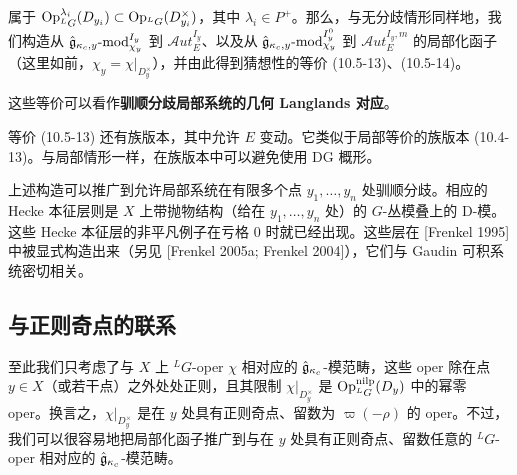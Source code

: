 属于 $\operatorname{Op}^{\lambda_i}_{{}^L G}(D_{y_i})\subset\operatorname{Op}_{{}^L G}(D^\times_{y_i})$，其中 $\lambda_i\in P^+$。那么，与无分歧情形同样地，我们构造从 $\hat{\mathfrak{g}}_{\kappa_c,y}\text{-mod}^{I_y}_{\chi_y}$ 到 $\mathcal{A}ut^{I_y}_E$、以及从 $\hat{\mathfrak{g}}_{\kappa_c,y}\text{-mod}^{I^0_y}_{\chi_y}$ 到 $\mathcal{A}ut^{I_y,m}_E$ 的局部化函子（这里如前，$\chi_y=\chi|_{D^\times_y}$），并由此得到猜想性的等价 (10.5-13)、(10.5-14)。

这些等价可以看作\textbf{驯顺分歧局部系统的几何 Langlands 对应}。

等价 (10.5-13) 还有族版本，其中允许 $E$ 变动。它类似于局部等价的族版本 (10.4-13)。与局部情形一样，在族版本中可以避免使用 DG 概形。

上述构造可以推广到允许局部系统在有限多个点 $y_1,\dots,y_n$ 处驯顺分歧。相应的 Hecke 本征层则是 $X$ 上带抛物结构（给在 $y_1,\dots,y_n$ 处）的 $G$-丛模叠上的 D-模。这些 Hecke 本征层的非平凡例子在亏格 $0$ 时就已经出现。这些层在 [Frenkel 1995] 中被显式构造出来（另见 [Frenkel 2005a; Frenkel 2004]），它们与 Gaudin 可积系统密切相关。


\subsection{与正则奇点的联系}

至此我们只考虑了与 $X$ 上 ${}^L G$-oper $\chi$ 相对应的 $\hat{\mathfrak{g}}_{\kappa_c}$-模范畴，这些 oper 除在点 $y\in X$（或若干点）之外处处正则，且其限制 $\chi|_{D^\times_y}$ 是 $\operatorname{Op}^{\mathrm{nilp}}_{{}^L G}(D_y)$ 中的幂零 oper。换言之，$\chi|_{D^\times_y}$ 是在 $y$ 处具有正则奇点、留数为 $\varpi(-\rho)$ 的 oper。不过，我们可以很容易地把局部化函子推广到与在 $y$ 处具有正则奇点、留数任意的 ${}^L G$-oper 相对应的 $\hat{\mathfrak{g}}_{\kappa_c}$-模范畴。

